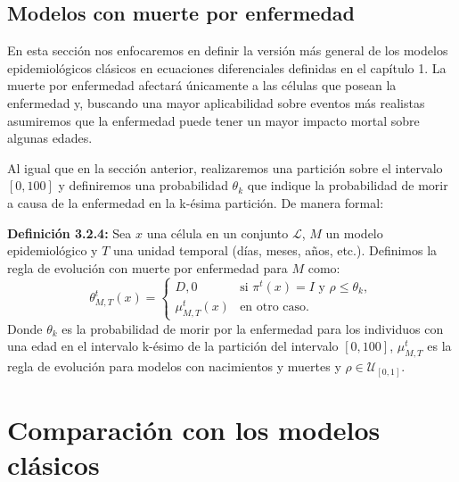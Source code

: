 \subsection{Modelos con muerte por enfermedad}
En esta sección nos enfocaremos en definir la versión más general de los modelos epidemiológicos clásicos en ecuaciones diferenciales definidas en el capítulo 1. La muerte por enfermedad afectará únicamente a las células que posean la enfermedad y, buscando una mayor aplicabilidad sobre eventos más realistas asumiremos que la enfermedad puede tener un mayor impacto mortal sobre algunas edades. 

Al igual que en la sección anterior, realizaremos una partición sobre el intervalo $[0,100]$ y definiremos una probabilidad $\theta_k$ que indique la probabilidad de morir a causa de la enfermedad en la k-ésima partición. De manera formal:

\textbf{Definición 3.2.4:} Sea $x$ una célula en un conjunto $\mathcal{L}$, $M$ un modelo epidemiológico y $T$ una unidad temporal (días, meses, años, etc.). Definimos la regla de evolución con muerte por enfermedad para $M$ como:
\begin{equation}
    \theta_{M,T}^t(x)=\left\{\begin{array}{ll}
        D,0 & \text{si }\pi^t(x)=I\text{ y }\rho\leq\theta_k, \\
        \mu_{M,T}^t(x) & \text{en otro caso.}
    \end{array}\right.
\end{equation}
Donde $\theta_k$ es la probabilidad de morir por la enfermedad para los individuos con una edad en el intervalo k-ésimo de la partición del intervalo $[0,100]$, $\mu_{M,T}^t$ es la regla de evolución para modelos con nacimientos y muertes y $\rho\in\mathcal{U}_{[0,1]}$.
\section{Comparación con los modelos clásicos}